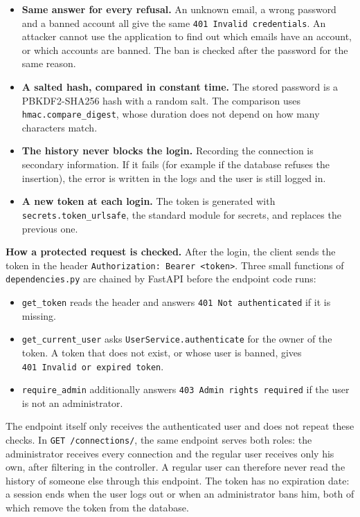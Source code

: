 \documentclass[
  french,
  11pt,
  a4paper,
]{report}
\providecommand{\tightlist}{%
  \setlength{\itemsep}{0pt}\setlength{\parskip}{0pt}}
\begin{document}
\begin{itemize}
\tightlist
\item
  \textbf{Same answer for every refusal.} An unknown email, a wrong
  password and a banned account all give the same
  \texttt{401\ Invalid\ credentials}. An attacker cannot use the
  application to find out which emails have an account, or which
  accounts are banned. The ban is checked after the password for the
  same reason.
\item
  \textbf{A salted hash, compared in constant time.} The stored password
  is a PBKDF2-SHA256 hash with a random salt. The comparison uses
  \texttt{hmac.compare\_digest}, whose duration does not depend on how
  many characters match.
\item
  \textbf{The history never blocks the login.} Recording the connection
  is secondary information. If it fails (for example if the database
  refuses the insertion), the error is written in the logs and the user
  is still logged in.
\item
  \textbf{A new token at each login.} The token is generated with
  \texttt{secrets.token\_urlsafe}, the standard module for secrets, and
  replaces the previous one.
\end{itemize}

\textbf{How a protected request is checked.} After the login, the client
sends the token in the header
\texttt{Authorization:\ Bearer\ \textless{}token\textgreater{}}. Three
small functions of \texttt{dependencies.py} are chained by FastAPI
before the endpoint code runs:

\begin{itemize}
\tightlist
\item
  \texttt{get\_token} reads the header and answers
  \texttt{401\ Not\ authenticated} if it is missing.
\item
  \texttt{get\_current\_user} asks \texttt{UserService.authenticate} for
  the owner of the token. A token that does not exist, or whose user is
  banned, gives \texttt{401\ Invalid\ or\ expired\ token}.
\item
  \texttt{require\_admin} additionally answers
  \texttt{403\ Admin\ rights\ required} if the user is not an
  administrator.
\end{itemize}

The endpoint itself only receives the authenticated user and does not
repeat these checks. In \texttt{GET\ /connections/}, the same endpoint
serves both roles: the administrator receives every connection and the
regular user receives only his own, after filtering in the controller. A
regular user can therefore never read the history of someone else
through this endpoint. The token has no expiration date: a session ends
when the user logs out or when an administrator bans him, both of which
remove the token from the database.
\end{document}
